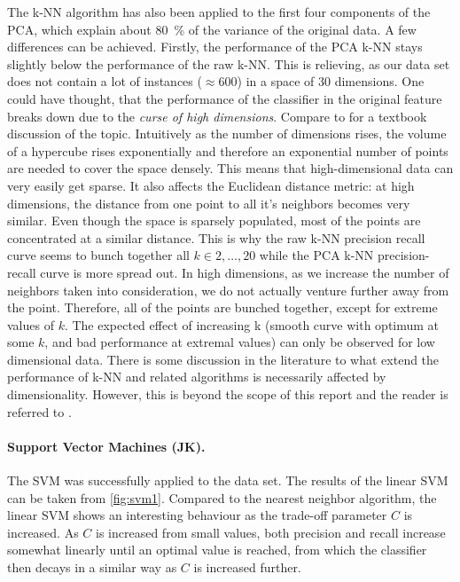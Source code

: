 \documentclass[12pt, a4paper]{scrartcl}
\begin{document}
The k-NN algorithm has also been applied to the first four components of the PCA, which explain about \SI{80}{\percent} of the variance of the original data. A few differences can be achieved. Firstly, the performance of the PCA k-NN stays slightly below the performance of the raw k-NN. This is relieving, as our data set does not contain a lot of instances ($\approx 600$) in a space of 30 dimensions. One could have thought, that the performance of the classifier in the original feature breaks down due to the \emph{curse of high dimensions}. Compare to \cite{barber2012brm, bishop2006prm} for a textbook discussion of the topic.
Intuitively as the number of dimensions rises, the volume of a hypercube rises exponentially and therefore an exponential number of points are needed to cover the space densely. This means that high-dimensional data can very easily get sparse. It also affects the Euclidean distance metric: at high dimensions, the distance from one point to all it's neighbors becomes very similar. Even though the space is sparsely populated, most of the points are concentrated at a similar distance. 
This is why the raw k-NN precision recall curve seems to bunch together all $k\in {2,\dots, 20}$ while the PCA k-NN precision-recall curve is more spread out. In high dimensions, as we increase the number of neighbors taken into consideration, we do not actually venture further away from the point. Therefore, all of the points are bunched together, except for extreme values of $k$. The expected effect of increasing k (smooth curve with optimum at some $k$, and bad performance at extremal values) can only be observed for low dimensional data.
There is some discussion in the literature to what extend the performance of k-NN and related algorithms is necessarily affected by dimensionality. However, this is beyond the scope of this report and the reader is referred to \cite{marimont1979nearest, Chavez01searchingin, paper3}.

\paragraph{Support Vector Machines (JK).} The SVM was successfully applied to the data set. The results of the linear SVM can be taken from \cref{fig:svm1}. Compared to the nearest neighbor algorithm, the linear SVM shows an interesting behaviour as the trade-off parameter $C$ is increased. As $C$ is increased from small values, both precision and recall increase somewhat linearly until an optimal value is reached, from which the classifier then decays in a similar way as $C$ is increased further.
\end{document}
